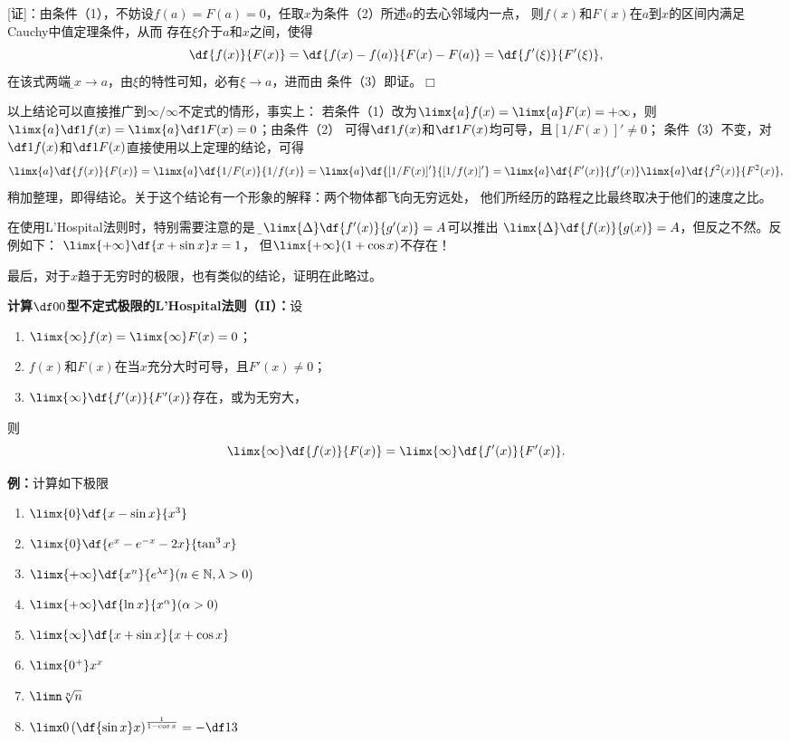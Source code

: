[证]：由条件（1），不妨设$f(a)=F(a)=0$，任取$x$为条件（2）所述$a$的去心邻域内一点，
则$f(x)$和$F(x)$在$a$到$x$的区间内满足Cauchy中值定理条件，从而
存在$\xi$介于$a$和$x$之间，使得
$$\df{f(x)}{F(x)}=\df{f(x)-f(a)}{F(x)-F(a)}
=\df{f'(\xi)}{F'(\xi)},$$
在该式两端{\b 令$x\to a$，由$\xi$的特性可知，必有$\xi\to a$}，进而由
条件（3）即证。\hfill$\Box$

以上结论可以直接推广到$\infty/\infty$不定式的情形，事实上：
若条件（1）改为$\limx{a}f(x)=\limx{a}F(x)=+\infty$，则
$\limx{a}\df1{f(x)}=\limx{a}\df1{F(x)}=0$；由条件（2）
可得$\df1{f(x)}$和$\df1{F(x)}$均可导，且$[1/F(x)]'\ne 0$；
条件（3）不变，对$\df1{f(x)}$和$\df1{F(x)}$直接使用以上定理的结论，可得
$$
	\limx{a}\df{f(x)}{F(x)}
	=\limx{a}\df{1/F(x)}{1/f(x)}
	=\limx{a}\df{[1/F(x)]'}{[1/f(x)]'}
	=\limx{a}\df{F'(x)}{f'(x)}\limx{a}\df{f^2(x)}{F^2(x)},
$$
稍加整理，即得结论。关于这个结论有一个形象的解释：两个物体都飞向无穷远处，
他们所经历的路程之比最终取决于他们的速度之比。

在使用L'Hospital法则时，特别需要注意的是
{\b 由$\limx{\Delta}\df{f'(x)}{g'(x)}=A$可以推出
$\limx{\Delta}\df{f(x)}{g(x)}=A$，但反之不然。}反例如下：
$\limx{+\infty}\df{x+\sin x}x=1$，
但$\limx{+\infty}(1+\cos x)$不存在！

最后，对于$x$趋于无穷时的极限，也有类似的结论，证明在此略过。

\begin{thx}
	{\bf 计算$\df00$型不定式极限的L'Hospital法则（II）：}设
	\begin{enumerate}[(1)]
	  \item $\limx{\infty}f(x)=\limx{\infty}F(x)=0$；
	  \item $f(x)$和$F(x)$在当$x$充分大时可导，且$F'(x)\ne0$；
	  \item $\limx{\infty}\df{f'(x)}{F'(x)}$存在，或为无穷大，
	\end{enumerate}
	则
	$$\limx{\infty}\df{f(x)}{F(x)}=\limx{\infty}\df{f'(x)}{F'(x)}.$$
\end{thx}

{\bf 例：}计算如下极限
\begin{enumerate}[(1)]
  \setlength{\itemindent}{1cm}
  \item $\limx{0}\df{x-\sin x}{x^3}$ 
  \item $\limx{0}\df{e^x-e^{-x}-2x}{\tan^3x}$ 
  \item $\limx{+\infty}\df{x^n}{e^{\lambda
  x}}(n\in\mathbb{N},\lambda>0)$ 
  \item $\limx{+\infty}\df{\ln x}{x^\alpha}(\alpha>0)$ 
  \item $\limx{\infty}\df{x+\sin x}{x+\cos x}$
  \item $\limx{0^+}x^x$
  \item $\limn\sqrt[n]n$
  \item $\limx0\left(\df{\sin x}x\right)^{\frac1{1-\cos x}}=-\df13$
\end{enumerate}

